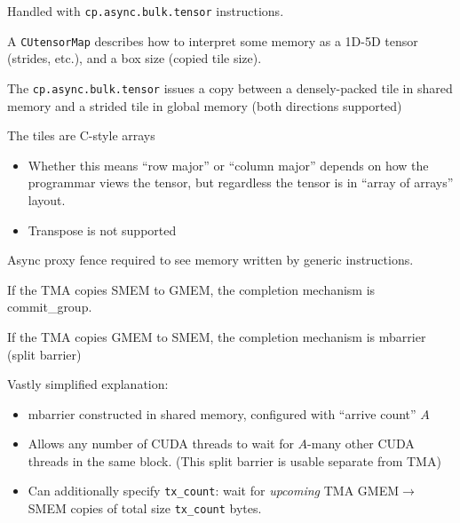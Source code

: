 \newpage
{}

\begin{minipage}[t]{0.5\textwidth}\fixminipage
Handled with \texttt{cp.async.bulk.tensor} instructions.

A \texttt{CUtensorMap} describes how to interpret some memory as a 1D-5D tensor (strides, etc.), and a box size (copied tile size).

The \texttt{cp.async.bulk.tensor} issues a copy between a densely-packed tile in shared memory and a strided tile in global memory
(both directions supported)

The tiles are C-style arrays
\begin{itemize}
  \item Whether this means ``row major'' or ``column major'' depends on how the programmar views the tensor, but regardless the tensor is in ``array of arrays'' layout.
  \item Transpose is not supported
\end{itemize}
\end{minipage}
\hfill
\begin{minipage}[t]{0.5\textwidth}\fixminipage
{}

Async proxy fence required to see memory written by generic instructions.


If the TMA copies SMEM to GMEM, the completion mechanism is commit\_group.

If the TMA copies GMEM to SMEM, the completion mechanism is mbarrier (split barrier)

Vastly simplified explanation:
\begin{itemize}
  \item mbarrier constructed in shared memory, configured with ``arrive count'' $A$
  \item Allows any number of CUDA threads to wait for $A$-many other CUDA threads in the same block.
    (This split barrier is usable separate from TMA)
  \item Can additionally specify \texttt{tx\_count}: wait for \textit{upcoming} TMA GMEM$\to$SMEM copies of total size \texttt{tx\_count} bytes.
\end{itemize}

\end{minipage}
\newpage
{}

